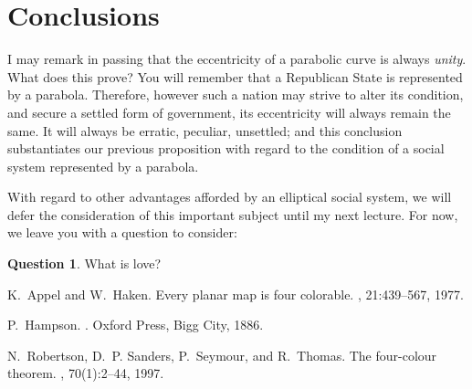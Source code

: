 \documentclass{jocg}
\theoremstyle{plain}
\theoremstyle{definition}
\newtheorem{question}{Question}
\begin{document}
\section{Conclusions}

I may remark in passing that the eccentricity of a parabolic curve is
always \emph{unity}. What does this prove? You will remember that a
Republican State is represented by a parabola. Therefore, however such
a nation may strive to alter its condition, and secure a settled form of
government, its eccentricity will always remain the same. It will always
be erratic, peculiar, unsettled; and this conclusion substantiates our
previous proposition with regard to the condition of a social system
represented by a parabola.

With regard to other advantages afforded by an elliptical social system,
we will defer the consideration of this important subject until my
next lecture.  For now, we leave you with a question to consider:

\begin{question}
  What is love?
\end{question}

%
%

\begin{thebibliography}{1}

K.~Appel and W.~Haken.
\newblock Every planar map is four colorable.
, 21:439--567, 1977.

P.~Hampson.
.
\newblock Oxford Press, Bigg City, 1886.

N.~Robertson, D.~P. Sanders, P.~Seymour, and R.~Thomas.
\newblock The four-colour theorem.
, 70(1):2--44, 1997.

\end{thebibliography}
\end{document}
